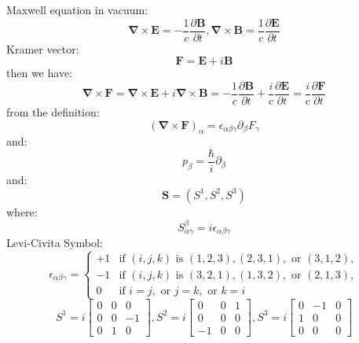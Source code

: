 \documentclass[12pt]{article}
\numberwithin{equation}{section}
\begin{document}
\begin{enumerate}
	Maxwell equation in vacuum:
	\begin{equation}
		\bm{\nabla}\times\bm{E}=-\frac{1}{c}\frac{\partial\bm{B}}{\partial t},
		\bm{\nabla}\times\bm{B}=\frac{1}{c}\frac{\partial\bm{E}}{\partial t}
	\end{equation}
	Kramer vector:
	\begin{equation}\bm{F}=\bm{E}+i\bm{B}\end{equation}
	then we have:
	\begin{equation}
		\bm{\nabla}\times\bm{F}=\bm{\nabla}\times\bm{E}+i\bm{\nabla}\times\bm{B}
		=-\frac{1}{c}\frac{\partial\bm{B}}{\partial t}+\frac{i}{c}\frac{\partial\bm{E}}{\partial t}
		=\frac{i}{c}\frac{\partial\bm{F}}{\partial t}
	\end{equation}
	from the definition:
	\begin{equation}
		(\bm{\nabla}\times\bm{F})_\alpha=\epsilon_{\alpha\beta\gamma}\partial_\beta F_\gamma
	\end{equation}
	and:
	\begin{equation}p_\beta=\frac{\hbar}{i}\partial_\beta\end{equation}
	and:
	\begin{equation}\bm{S}=(S^1,S^2,S^3)\end{equation}
	where:
	\begin{equation}S^\beta_{\alpha\gamma}=i\epsilon_{\alpha\beta\gamma}\end{equation}
	Levi-Civita Symbol:
	\begin{equation}
		\epsilon_{\alpha\beta\gamma}=
		\begin{cases}
		+1 & \text{if } (i,j,k) \text{ is } (1,2,3), (2,3,1), \text{ or } (3,1,2), \\
       		-1 & \text{if } (i,j,k) \text{ is } (3,2,1), (1,3,2), \text{ or } (2,1,3), \\
    		0 & \text{if } i = j, \text{ or } j = k, \text{ or } k = i
    		\end{cases}
	\end{equation}
	\begin{equation}
		S^1= i\begin{bmatrix}0&0&0\\0&0&-1\\0&1&0\end{bmatrix},
		S^2= i\begin{bmatrix}0&0&1\\0&0&0\\-1&0&0\end{bmatrix},
		S^3= i\begin{bmatrix}0&-1&0\\1&0&0\\0&0&0\end{bmatrix}

\end{equation}
\end{enumerate}
\end{document}
